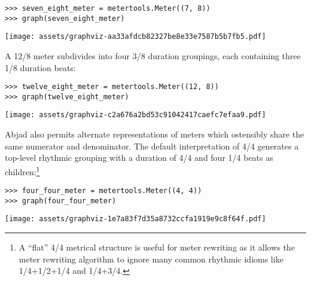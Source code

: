 \begin{singlespacing}
\vspace{-0.5\baselineskip}
\begin{lstlisting}
>>> seven_eight_meter = metertools.Meter((7, 8))
>>> graph(seven_eight_meter)
\end{lstlisting}
\noindent\texttt{[image: assets/graphviz-aa33afdcb82327be8e33e7587b5b7fb5.pdf]}
\end{singlespacing}

\noindent A 12/8 meter subdivides into four 3/8 duration groupings, each
containing three 1/8 duration beats:

\begin{comment}
<abjad>
twelve_eight_meter = metertools.Meter((12, 8))
graph(twelve_eight_meter)
</abjad>
\end{comment}

\begin{singlespacing}
\vspace{-0.5\baselineskip}
\begin{lstlisting}
>>> twelve_eight_meter = metertools.Meter((12, 8))
>>> graph(twelve_eight_meter)
\end{lstlisting}
\noindent\texttt{[image: assets/graphviz-c2a676a2bd53c91042417caefc7efaa9.pdf]}
\end{singlespacing}

\noindent Abjad also permits alternate representations of meters which
ostensibly share the same numerator and denominator. The default interpretation
of 4/4 generates a top-level rhythmic grouping with a duration of 4/4 and four
1/4 beats as children:\footnote{A \enquote{flat} 4/4 metrical structure is
useful for meter rewriting as it allows the meter rewriting algorithm to ignore
many common rhythmic idioms like 1/4+1/2+1/4 and 1/4+3/4.}

\begin{comment}
<abjad>
four_four_meter = metertools.Meter((4, 4))
graph(four_four_meter)
</abjad>
\end{comment}

\begin{singlespacing}
\vspace{-0.5\baselineskip}
\begin{lstlisting}
>>> four_four_meter = metertools.Meter((4, 4))
>>> graph(four_four_meter)
\end{lstlisting}
\noindent\texttt{[image: assets/graphviz-1e7a83f7d35a8732ccfa1919e9c8f64f.pdf]}
\end{singlespacing}

